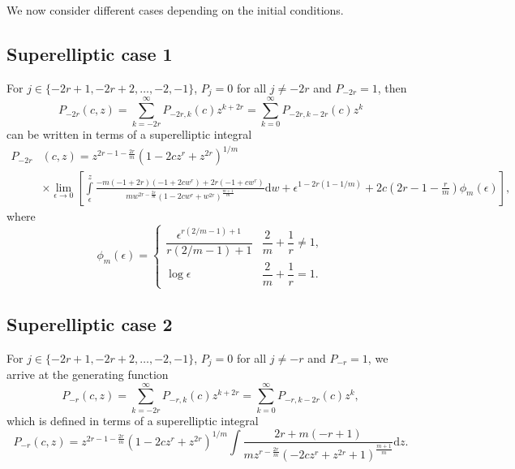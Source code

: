 \documentclass[final,nopreprintline]{elsarticle}
\theoremstyle{definition}
\numberwithin{equation}{section}
\theoremstyle{remark}
\begin{document}
We now consider different cases depending on the initial conditions.

\subsection{Superelliptic case 1}\label{subsec:superelliptic1}

For $j\in\{-2r+1,-2r+2,\dots, -2,-1\}$, $P_{j}=0$ for all $j\neq -2r$ and $P_{-2r}=1$, then
\begin{equation*}
    P_{-2r}(c,z)=\sum _{k=-2r}^{\infty }  P_{-2r,k}(c)z^{k+2r}
    =\sum _{k=0}^{\infty }P_{-2r,k-2r}(c) z^{k}
\end{equation*}
can be written in terms of a superelliptic integral
\begin{align}
     P_{-2r}&(c,z)=z^{2 r-1-\frac{2r}{m}} \left( 1-2 c z^r+z^{2 r}\right)^{1/m}\nonumber\\
    &\times\lim_{\epsilon\to 0}\left[ \int\limits_{\epsilon}^{z} \frac{- m (-1 + 2 r) (-1 + 2 c w^r)+2 r (-1 + c w^r) }{m w^{2 r-\frac{2r}{m}}   \left(1-2 c w^r+w^{2 r}\right)^{\frac{m+1}{m}}}  \textrm{d}w+\epsilon^{1-2r(1-1/m)}+2c(2r-1-\tfrac{r}{m})\phi_m(\epsilon)\right],
\end{align}
where
\[
\phi_m(\epsilon)=
\begin{cases}
    \dfrac{\epsilon^{r(2/m-1)+1}}{r(2/m-1)+1} &  \dfrac{2}{m}+\dfrac{1}{r}\neq 1,\\[6pt]
    \log{\epsilon} &  \dfrac{2}{m}+\dfrac{1}{r}=1.
\end{cases}
\]

\subsection{Superelliptic case 2}\label{subsec:superelliptic2}

For $j\in\{-2r+1,-2r+2,\dots, -2,-1\}$, $P_{j}=0$ for all $j\neq -r$ and $P_{-r}=1$, we arrive at the generating function
\begin{equation*}
    P_{-r}(c,z)=\sum _{k=-2r}^{\infty }  P_{-r,k}(c)z^{k+2r}
    =\sum _{k=0}^{\infty }P_{-r,k-2r}(c) z^{k},
\end{equation*}
which is defined in terms of a superelliptic integral
\begin{equation*}
      P_{-r}(c,z)=z^{2 r-1-\frac{2r}{m}} \left( 1-2 c z^r+z^{2 r}\right)^{1/m} \int \frac{2 r+ m (-r+1)}{m z^{r-\frac{2r}{m}}\left(-2 c z^r+z^{2 r}+1\right)^{\frac{m+1}{m}}} \textrm{d}z.
\end{equation*}
\end{document}
